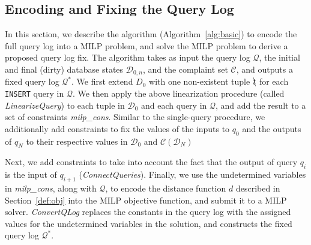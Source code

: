 \subsection{Encoding and Fixing the Query Log}
\label{sec:milp}

In this section, we describe the algorithm (Algorithm~\ref{alg:basic}) to encode 
the full query log into a MILP problem, and solve the MILP problem to derive a proposed query log fix.
The algorithm takes as input the query log $\mathcal{Q}$, the initial and final (dirty) database states 
$\mathcal{D}_{0, n}$, and the complaint set $\mathcal{C}$, and outputs a fixed query 
log $\mathcal{Q}^*$.  We first extend $D_0$ with one non-existent tuple $\bcancel{t}$
for each \texttt{INSERT} query in $\mathcal{Q}$.
We then apply the above linearization procedure (called \textit{LinearizeQuery})
to each tuple in $\mathcal{D}_0$ and each query in $\mathcal{Q}$, 
and add the result to a set of constraints \textit{milp\_cons}.
Similar to the single-query procedure, we additionally add constraints to fix the
values of the inputs to $q_0$ and the outputs of $q_N$ to their respective values in
$\mathcal{D}_0$ and $\mathcal{C}(\mathcal{D}_N)$

Next, we add constraints to take into account the fact that the output of 
query $q_i$ is the input of $q_{i+1}$ (\textit{ConnectQueries}).
Finally, we use the undetermined variables in \textit{milp\_cons}, along with $\mathcal{Q}$,
to encode the distance function $d$ described in Section~\ref{def:obj} 
into the MILP objective function, and submit it to a MILP solver.
\textit{ConvertQLog} replaces the constants in the query log with the 
assigned values for the undetermined variables in the solution, and constructs
the fixed query log $\mathcal{Q}^*$.





